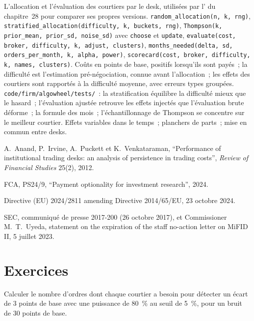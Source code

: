 \begin{build}
 L'allocation et l'évaluation des courtiers par le desk, utilisées par l' du chapitre~28 pour comparer ses propres versions.
 \texttt{random\_allocation(n, k, rng)}, \texttt{stratified\_allocation(difficulty, k, buckets, rng)},
\texttt{Thompson(k, prior\_mean, prior\_sd, noise\_sd)} avec \texttt{choose} et \texttt{update}, \texttt{evaluate(cost, broker, difficulty, k, adjust, clusters)},
\texttt{months\_needed(delta, sd, orders\_per\_month, k, alpha, power)}, \texttt{scorecard(cost, broker, difficulty, k, names, clusters)}.
 Coûts en points de base, positifs lorsqu'ils sont payés~; la difficulté est l'estimation pré-négociation, connue avant l'allocation~; les effets des courtiers sont rapportés à la
difficulté moyenne, avec erreurs types groupées.
 \texttt{code/firm/algowheel/tests/}~: la stratification équilibre la difficulté mieux que le hasard~; l'évaluation ajustée retrouve
les effets injectés que l'évaluation brute déforme~; la formule des mois~; l'échantillonnage de Thompson se concentre sur le meilleur courtier.
 Effets variables dans le temps~; planchers de parts~; mise en commun entre desks.
\end{build}

\begin{omsources}
\item A.~Anand, P.~Irvine, A.~Puckett et K.~Venkataraman, ``Performance of institutional trading desks: an analysis of persistence in trading
costs'', \emph{Review of Financial Studies} 25(2), 2012.
\item FCA, PS24/9, ``Payment optionality for investment research'', 2024.
\item Directive (EU) 2024/2811 amending Directive 2014/65/EU, 23 octobre 2024.
\item SEC, communiqué de presse 2017-200 (26 octobre 2017), et Commissioner M.~T.~Uyeda, statement on the expiration of the staff no-action letter on
MiFID II, 5 juillet 2023.
\end{omsources}

\section{Exercices}

\begin{exercise}[$\star$]\label{exo:mx:the-buy-side-trading-desk-and-its-brokers:1}
Calculer le nombre d'ordres dont chaque courtier a besoin pour détecter un écart de 3 points de base avec une puissance de 80~\% au seuil de 5~\%, pour un bruit de 30 points de base.
\end{exercise}


